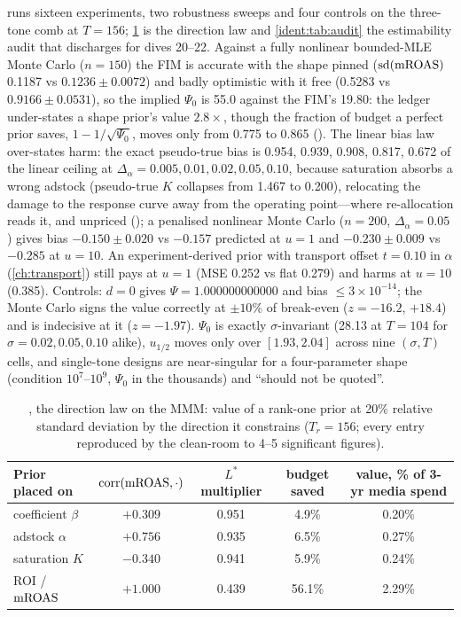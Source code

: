 \emph{} runs sixteen experiments, two robustness sweeps and four controls on the three-tone comb at $T = 156$; \cref{ident:tab:direction} is the direction law and \cref{ident:tab:audit} the estimability audit that discharges  for dives 20--22. Against a fully nonlinear bounded-MLE Monte Carlo ($n = 150$) the FIM is accurate with the shape pinned ($\mathrm{sd}(\mathrm{mROAS})$ 0.1187 vs $0.1236 \pm 0.0072$) and badly optimistic with it free (0.5283 vs $0.9166 \pm 0.0531$), so the implied $\Psi_0$ is 55.0 against the FIM's 19.80: the ledger under-states a shape prior's value $2.8\times$, though the fraction of budget a perfect prior saves, $1 - 1/\sqrt{\Psi_0}$, moves only from 0.775 to 0.865 (). The linear bias law over-states harm: the exact pseudo-true bias is 0.954, 0.939, 0.908, 0.817, 0.672 of the linear ceiling at $\Delta_\alpha = 0.005, 0.01, 0.02, 0.05, 0.10$, because saturation absorbs a wrong adstock (pseudo-true $K$ collapses from 1.467 to 0.200), relocating the damage to the response curve away from the operating point---where re-allocation reads it, and unpriced (); a penalised nonlinear Monte Carlo ($n = 200$, $\Delta_\alpha = 0.05$) gives bias $-0.150 \pm 0.020$ vs $-0.157$ predicted at $u = 1$ and $-0.230 \pm 0.009$ vs $-0.285$ at $u = 10$. An experiment-derived prior with transport offset $t = 0.10$ in $\alpha$ (\cref{ch:transport}) still pays at $u = 1$ (MSE 0.252 vs flat 0.279) and harms at $u = 10$ (0.385). Controls: $d = 0$ gives $\Psi = 1.000000000000$ and bias $\le 3\times10^{-14}$; the Monte Carlo signs the value correctly at $\pm10\%$ of break-even ($z = -16.2$, $+18.4$) and is indecisive at it ($z = -1.97$). $\Psi_0$ is exactly $\sigma$-invariant (28.13 at $T = 104$ for $\sigma = 0.02, 0.05, 0.10$ alike), $u_{1/2}$ moves only over $[1.93, 2.04]$ across nine $(\sigma, T)$ cells, and single-tone designs are near-singular for a four-parameter shape (condition $10^7$--$10^9$, $\Psi_0$ in the thousands) and ``should not be quoted''.

\begin{table}[htbp]
\centering\small
\caption{, the direction law on the MMM: value of a rank-one prior at 20\% relative standard deviation by the direction it constrains ($T_r = 156$; every entry reproduced by the clean-room to 4--5 significant figures).}
\label{ident:tab:direction}
\begin{tabular}{lcccc}
\toprule
Prior placed on & $\mathrm{corr}(\mathrm{mROAS}, \cdot)$ & $L^*$ multiplier & budget saved & value, \% of 3-yr media spend \\
\midrule
coefficient $\beta$ & $+0.309$ & 0.951 & 4.9\% & 0.20\% \\
adstock $\alpha$ & $+0.756$ & 0.935 & 6.5\% & 0.27\% \\
saturation $K$ & $-0.340$ & 0.941 & 5.9\% & 0.24\% \\
ROI / $\mathrm{mROAS}$ & $+1.000$ & 0.439 & 56.1\% & 2.29\% \\
\bottomrule
\end{tabular}
\end{table}

